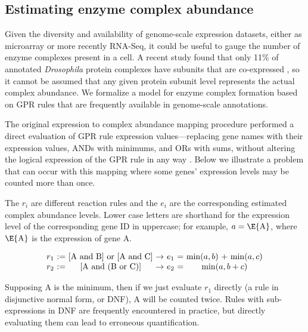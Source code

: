\subsection{Estimating enzyme complex abundance}

Given the diversity and availability of genome-scale expression datasets,
either as microarray or more recently RNA-Seq, it could be useful to
gauge the number of enzyme complexes present in a cell. A recent
study found that only 11\% of annotated \textit{Drosophila}
protein complexes have subunits that are co-expressed
\citep{Juschke2013}, so it cannot be assumed that any given protein
subunit level represents the actual complex abundance. We formalize a
model for enzyme complex formation based on GPR rules that are
frequently available in genome-scale annotations.

The original expression to complex abundance mapping procedure
performed a direct evaluation of GPR rule expression
values---replacing gene names with their expression values, ANDs with
minimums, and ORs with sums, without altering the logical expression
of the GPR rule in any way \citep{Lee2012}. Below we illustrate a 
problem that can occur with this mapping where some genes' expression
levels may be counted more than once. 

The $r_i$ are different reaction rules and the $e_i$ are the
corresponding estimated complex abundance levels. Lower case letters
are shorthand for the expression level of the corresponding gene ID in
uppercase; for example, $a = \E{\textnormal{A}}$, where
$\E{\textnormal{A}}$ is the expression of gene A.

\begin{equation}
\centering
{\setlength{\tabcolsep}{.16667em}
\begin{tabular}{cccccccc}
$r_1$ & := & [A and B] or [A and C] & $\rightarrow$ & $e_1$  &=& $\min(a,b$) + $\min(a,c$) \\ 
$r_2$ & := & [A and (B or C)]       & $\rightarrow$ & $e_2$  &=&  $\min(a, b + c$) 
\end{tabular} 
}
\end{equation}

Supposing A is the minimum, then if we just evaluate $r_1$ directly (a
rule in disjunctive normal form, or DNF), A will be counted twice.
Rules with sub-expressions in DNF are frequently encountered in practice,
but directly evaluating them can lead to erroneous quantification.

